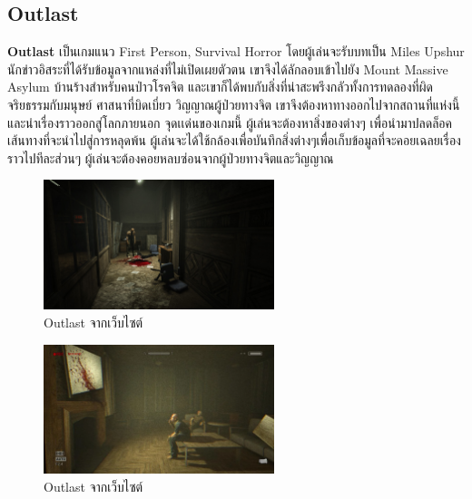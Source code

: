 \newpage
\subsection{Outlast}
\subsubitem \textbf{Outlast} \cite{outlast:theory} เป็นเกมแนว First Person, Survival Horror โดยผู้เล่นจะรับบทเป็น Miles Upshur นักข่าวอิสระที่ได้รับข้อมูลจากแหล่งที่ไม่เปิดเผยตัวตน เขาจึงได้ลักลอบเข้าไปยัง Mount Massive Asylum บ้านร้างสำหรับคนป่าวโรคจิต และเขาก็ได้พบกับสิ่งที่น่าสะพรึงกลัวทั้งการทดลองที่ผิดจริยธรรมกับมนุษย์ ศาสนาที่บิดเบี่ยว วิญญาณผู้ป่วยทางจิต เขาจึงต้องหาทางออกไปจากสถานที่แห่งนี้ และนำเรื่องราวออกสู่โลกภายนอก จุดเเด่นของเกมนี้ ผู้เล่นจะต้องหาสิ่งของต่างๆ เพื่อนำมาปลดล็อคเส้นทางที่จะนำไปสู่การหลุดพ้น ผู้เล่นจะได้ใช้กล้องเพื่อบันทึกสิ่งต่างๆเพื่อเก็บข้อมูลที่จะคอยเฉลยเรื่องราวไปทีละส่วนๆ ผู้เล่นจะต้องคอยหลบซ่อนจากผู้ป่วยทางจิตและวิญญาณ
\begin{figure}[h]
  \centering
  \includegraphics[width=0.6\textwidth, height=0.2\textheight]{Images/OutlastScreenShot-04-1920x1080.jpg}
  \caption{Outlast จากเว็บไซต์}\label{OutlastScreenShot1}
\end{figure}

\begin{figure}[h]
  \centering
  \includegraphics[width=0.6\textwidth, height=0.2\textheight]{Images/Screenshot 2023-10-06 151547.png}
  \caption{Outlast จากเว็บไซต์}\label{OutlastScreenShot2}
\end{figure}

\newpage
